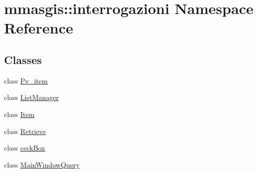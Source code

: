 \hypertarget{namespacemmasgis_1_1interrogazioni}{
\section{mmasgis::interrogazioni Namespace Reference}
\label{namespacemmasgis_1_1interrogazioni}
}
\subsection*{Classes}
\begin{DoxyCompactItemize}
\item 
class \hyperlink{classmmasgis_1_1interrogazioni_1_1Pv__item}{Pv\_\-item}
\item 
class \hyperlink{classmmasgis_1_1interrogazioni_1_1ListManager}{ListManager}
\item 
class \hyperlink{classmmasgis_1_1interrogazioni_1_1Item}{Item}
\item 
class \hyperlink{classmmasgis_1_1interrogazioni_1_1Retrieve}{Retrieve}
\item 
class \hyperlink{classmmasgis_1_1interrogazioni_1_1ceckBox}{ceckBox}
\item 
class \hyperlink{classmmasgis_1_1interrogazioni_1_1MainWindowQuery}{MainWindowQuery}
\end{DoxyCompactItemize}
